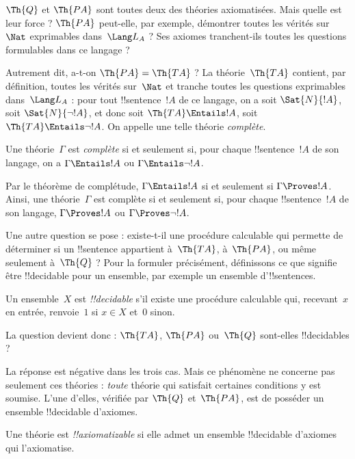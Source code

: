 \documentclass[../../../include/open-logic-section]{subfiles}
\begin{document}
$\Th{Q}$ et $\Th{PA}$ sont toutes deux des théories axiomatisées.
Mais quelle est leur force ? $\Th{PA}$ peut-elle, par exemple,
démontrer toutes les vérités sur~$\Nat$ exprimables dans~$\Lang L_A$ ?
Ses axiomes tranchent-ils toutes les questions formulables dans ce
langage ?

Autrement dit, a-t-on $\Th{PA}=\Th{TA}$ ? La théorie~$\Th{TA}$
contient, par définition, toutes les vérités sur~$\Nat$ et tranche
toutes les questions exprimables dans~$\Lang L_A$ : pour tout
!!{sentence}~$!A$ de ce langage, on a soit $\Sat{N}{!A}$, soit
$\Sat{N}{\lnot !A}$, et donc soit $\Th{TA}\Entails !A$, soit
$\Th{TA}\Entails\lnot !A$. On appelle une telle théorie
\emph{complète}.

\begin{defn}
Une théorie~$\Gamma$ est \emph{complète} si et seulement si, pour
chaque !!{sentence}~$!A$ de son langage, on a
$\Gamma\Entails !A$ ou $\Gamma\Entails\lnot !A$.
\end{defn}

\begin{explain}
Par le théorème de complétude, $\Gamma\Entails !A$ si et seulement
si $\Gamma\Proves !A$. Ainsi, une théorie~$\Gamma$ est complète si
et seulement si, pour chaque !!{sentence}~$!A$ de son langage,
$\Gamma\Proves !A$ ou $\Gamma\Proves\lnot !A$.
\end{explain}

Une autre question se pose : existe-t-il une procédure calculable
qui permette de déterminer si un !!{sentence} appartient
à~$\Th{TA}$, à~$\Th{PA}$, ou même seulement à~$\Th{Q}$ ? Pour
la formuler précisément, définissons ce que signifie être
!!{decidable} pour un ensemble, par exemple un ensemble
d'!!{sentence}s.

\begin{defn}
Un ensemble~$X$ est \emph{!!{decidable}} s'il existe une procédure
calculable qui, recevant~$x$ en entrée, renvoie~$1$ si $x\in X$
et~$0$ sinon.
\end{defn}

La question devient donc : $\Th{TA}$, $\Th{PA}$ ou~$\Th{Q}$
sont-elles !!{decidable}s ?

La réponse est négative dans les trois cas. Mais ce phénomène ne
concerne pas seulement ces théories : \emph{toute} théorie qui
satisfait certaines conditions y est soumise. L'une d'elles,
vérifiée par $\Th{Q}$ et~$\Th{PA}$, est de posséder un ensemble
!!{decidable} d'axiomes.

\begin{defn}
Une théorie est \emph{!!{axiomatizable}} si elle admet un ensemble
!!{decidable} d'axiomes qui l'axiomatise.
\end{defn}
\end{document}
